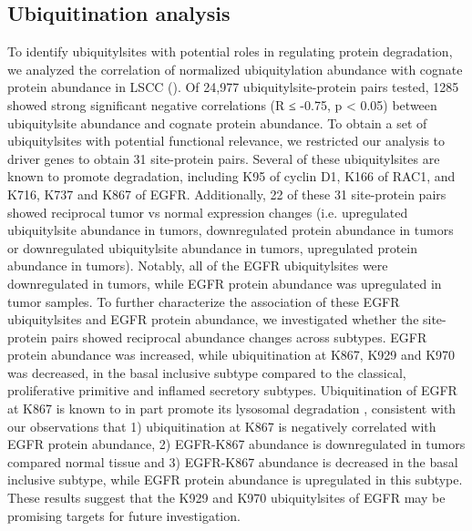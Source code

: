\subsection{Ubiquitination analysis}
To identify ubiquitylsites with potential roles in regulating protein degradation, we analyzed the correlation of normalized ubiquitylation abundance with cognate protein abundance in LSCC (). Of 24,977 ubiquitylsite-protein pairs tested, 1285 showed strong significant negative correlations (R ≤ -0.75, p < 0.05) between ubiquitylsite abundance and cognate protein abundance. To obtain a set of ubiquitylsites with potential functional relevance, we restricted our analysis to driver genes to obtain 31 site-protein pairs. Several of these ubiquitylsites are known to promote degradation, including K95 of cyclin D1, K166 of RAC1, and K716, K737 and K867 of EGFR. Additionally, 22 of these 31 site-protein pairs showed reciprocal tumor vs normal expression changes (i.e. upregulated ubiquitylsite abundance in tumors, downregulated protein abundance in tumors or downregulated ubiquitylsite abundance in tumors, upregulated protein abundance in tumors). Notably, all of the EGFR ubiquitylsites were downregulated in tumors, while EGFR protein abundance was upregulated in tumor samples. To further characterize the association of these EGFR ubiquitylsites and EGFR protein abundance, we investigated whether the site-protein pairs showed reciprocal abundance changes across subtypes. EGFR protein abundance was increased, while ubiquitination at K867, K929 and K970 was decreased, in the basal inclusive subtype compared to the classical, proliferative primitive and inflamed secretory subtypes. Ubiquitination of EGFR at K867 is known to in part promote its lysosomal degradation \cite{shench_hsulc:ZNRF1Mediates2021}, consistent with our observations that 1) ubiquitination at K867 is negatively correlated with EGFR protein abundance, 2) EGFR-K867 abundance is downregulated in tumors compared normal tissue and 3) EGFR-K867 abundance is decreased in the basal inclusive subtype, while EGFR protein abundance is upregulated in this subtype. These results suggest that the K929 and K970 ubiquitylsites of EGFR may be promising targets for future investigation.


